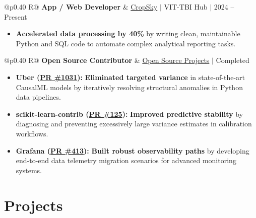 \documentclass[a4paper,11pt]{article}
\newcommand{\subheading}[1]{\textbf{#1}}
\newcommand{\meta}[1]{{\fontsize{10}{12}\selectfont\textcolor[HTML]{3A3A3A}{#1}}}
\newcommand{\ulink}[2]{\href{#1}{#2}}
\begin{document}
\begin{tabularx}{\linewidth}{@{}p{0.40\linewidth} R@{}}
\subheading{App / Web Developer} & \meta{\ulink{https://sites.google.com/view/cropsky/home}{CropSky} $|$ VIT-TBI Hub $|$ 2024 -- Present}
\end{tabularx}
\begin{itemize}[nosep, leftmargin=1.5em, itemsep=2pt, topsep=2pt]
  \item {\color[HTML]{0A0A0A}\fontsize{11}{14}\selectfont \textbf{Accelerated data processing by 40\%} by writing clean, maintainable Python and SQL code to automate complex analytical reporting tasks.}
\end{itemize}

\begin{tabularx}{\linewidth}{@{}p{0.40\linewidth} R@{}}
\subheading{Open Source Contributor} & \meta{\ulink{https://github.com/su-jin1425/My-Open-Source-Contributions}{Open Source Projects} $|$ Completed}
\end{tabularx}
\begin{itemize}[nosep, leftmargin=1.5em, itemsep=2pt, topsep=2pt]
  \item {\color[HTML]{0A0A0A}\fontsize{11}{14}\selectfont \textbf{Uber (\ulink{https://github.com/uber/causalml/pull/1031}{PR \#1031}):} \textbf{Eliminated targeted variance} in state-of-the-art CausalML models by iteratively resolving structural anomalies in Python data pipelines.}
  \item {\color[HTML]{0A0A0A}\fontsize{11}{14}\selectfont \textbf{scikit-learn-contrib (\ulink{https://github.com/scikit-learn-contrib/forest-confidence-interval/pull/125}{PR \#125}):} \textbf{Improved predictive stability} by diagnosing and preventing excessively large variance estimates in calibration workflows.}
  \item {\color[HTML]{0A0A0A}\fontsize{11}{14}\selectfont \textbf{Grafana (\ulink{https://github.com/grafana/alloy-scenarios/pull/413}{PR \#413}):} \textbf{Built robust observability paths} by developing end-to-end data telemetry migration scenarios for advanced monitoring systems.}
\end{itemize}

\section{Projects}
\vspace{2pt}
\end{document}
